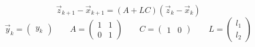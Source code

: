 \documentclass{article}
\begin{document}
\thispagestyle{empty}

$$
\vec{z}_{k+1}-\vec{x}_{k+1} = (A+LC)(\vec{z}_k-\vec{x}_k)
$$
$$
\vec{y}_k=\begin{pmatrix}y_k\end{pmatrix}\qquad A=\begin{pmatrix} 1 & 1 \\ 0 & 1\end{pmatrix} \qquad C=\begin{pmatrix}1 & 0\end{pmatrix} \qquad L=\begin{pmatrix}l_1 \\ l_2\end{pmatrix}
$$
\end{document}
